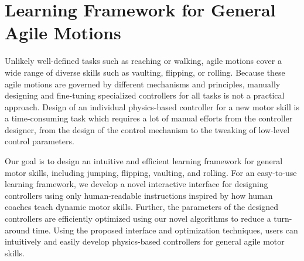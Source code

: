 \section{Learning Framework for General Agile Motions}
Unlikely well-defined tasks such as reaching or walking,
agile motions cover a wide range of diverse skills such as vaulting, flipping,
or rolling.
Because these agile motions are governed by different mechanisms and
principles, manually designing and fine-tuning specialized controllers for all
tasks is not a practical approach.
Design of an individual physics-based controller for a new motor skill is 
a time-consuming task which requires a lot of manual efforts from the controller
designer, from the design of the control mechanism to the tweaking of low-level
control parameters. 

Our goal is to design an intuitive and efficient learning framework
for general motor skills, including jumping, flipping, vaulting, and rolling.
For an easy-to-use learning framework,
we develop a novel interactive interface for designing controllers using only
human-readable instructions inspired by how human coaches teach dynamic motor
skills. 
Further, the parameters of the designed controllers are efficiently optimized
using our novel algorithms to reduce a turn-around time.
Using the proposed interface and optimization techniques,
users can intuitively and easily develop physics-based controllers for
general agile motor skills.

